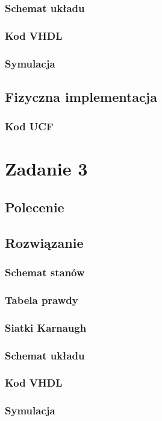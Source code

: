 \documentclass[a4paper,12pt]{extarticle}  %
\begin{document}
\subsubsection{Schemat układu}
\subsubsection{Kod VHDL}
\subsubsection{Symulacja}
\subsection{Fizyczna implementacja}
\subsubsection{Kod UCF}

\section{Zadanie 3}
\subsection{Polecenie}
\subsection{Rozwiązanie}
\subsubsection{Schemat stanów}
\subsubsection{Tabela prawdy}
\subsubsection{Siatki Karnaugh}
\subsubsection{Schemat układu}
\subsubsection{Kod VHDL}
\subsubsection{Symulacja}
\end{document}
